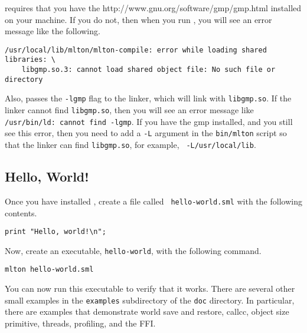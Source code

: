 {\mlton} requires that you have the
		  {http://www.gnu.org/software/gmp/gmp.html}
installed on your machine.  If you do not, then when you run {\mlton},
you will see an error message like the following.
\begin{verbatim}
/usr/local/lib/mlton/mlton-compile: error while loading shared libraries: \
    libgmp.so.3: cannot load shared object file: No such file or directory
\end{verbatim}
Also, {\mlton} passes the {\tt -lgmp} flag to the linker, which will
link with {\tt libgmp.so}.  If the linker cannot find {\tt libgmp.so},
then you will see an error message like {\tt /usr/bin/ld: cannot find
-lgmp}.  If you have the gmp installed, and you still see this error,
then you need to add a {\tt -L} argument in the {\tt bin/mlton} script
so that the linker can find {\tt libgmp.so}, for example, {\tt
-L/usr/local/lib}.

\subsection{Hello, World!}

Once you have installed {\mlton}, create a file called {\tt
hello-world.sml} with the following contents.

\begin{verbatim}
print "Hello, world!\n";
\end{verbatim}
Now, create an executable, {\tt hello-world}, with the following command.
\begin{verbatim}
mlton hello-world.sml
\end{verbatim}
You can now run this executable to verify that it works.  There are
several other small examples in the {\tt examples} subdirectory of the
{\tt doc} directory.  In particular, there are examples that
demonstrate world save and restore, callcc, object size primitive,
threads, profiling, and the FFI.
